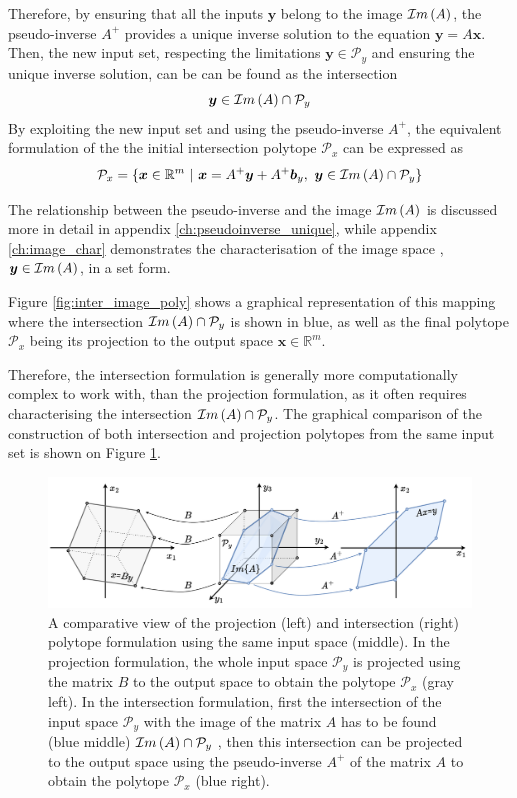 Therefore, by ensuring that all the inputs $\bm{y}$ belong to the image $\mathcal{I}m\left(A\right)$, the pseudo-inverse $A^+$ provides a unique inverse solution to the equation $\bm{y} = A\bm{x}$. Then, the new input set, respecting the limitations $\bm{y}\in\mathcal{P}_y$ and ensuring the unique inverse solution, can be can be found as the intersection
\begin{equation}
   \bm{y} \in \mathcal{I}m\left(A\right) \cap \mathcal{P}_y
    \label{eq:intersection_ai}
\end{equation}
By exploiting the new input set and using the pseudo-inverse $A^+$, the equivalent formulation of the the initial intersection polytope $\mathcal{P}_x$ can be expressed as
\begin{equation}
\mathcal{P}_x=\{\bm{x}\in\mathbb{R}^m~|~ \bm{x} = A^+\bm{y} + A^+\bm{b}_y,~ \bm{y} \in \mathcal{I}m\left(A\right)\cap\mathcal{P}_y\} \label{eq:proj_inter}
\end{equation}

The relationship between the pseudo-inverse and the image $\mathcal{I}m\left(A\right)$ is discussed more in detail in appendix \ref{ch:pseudoinverse_unique}, while appendix \ref{ch:image_char} demonstrates the characterisation of the image space , $\bm{y}\in\mathcal{I}m\left(A\right)$, in a set form. 


Figure \ref{fig:inter_image_poly} shows a graphical representation of this mapping where the intersection $ \mathcal{I}m\left(A\right)\cap\mathcal{P}_y$ is shown in blue, as well as the final polytope $\mathcal{P}_x$ being its projection to the output space $\bm{x}\in \mathbb{R}^m$. 

Therefore, the intersection formulation is generally more computationally complex to work with, than the projection formulation, as it often requires characterising the intersection $\mathcal{I}m\left(A\right)\cap\mathcal{P}_y$.  The graphical comparison of the construction of both intersection and projection polytopes from the same input set is shown on Figure \ref{fig:inter_proj}.


\begin{figure}
    \centering
    \includegraphics[width=\linewidth]{Chapters/imgs/intersection_projection.pdf}
    \caption{A comparative view of the projection (left) and intersection (right) polytope formulation using the same input space (middle). In the projection formulation, the whole input space $\mathcal{P}_y$ is projected using the matrix $B$ to the output space to obtain the polytope $\mathcal{P}_x$ (gray left). In the intersection formulation, first the intersection of the input space $\mathcal{P}_y$ with the image of the matrix $A$ has to be found (blue middle) $\mathcal{I}m\left(A\right) \cap \mathcal{P}_y$ , then this intersection can be projected to the output space using the pseudo-inverse $A^+$ of the matrix $A$ to obtain the polytope $\mathcal{P}_x$ (blue right).}
    \label{fig:inter_proj}
\end{figure}

